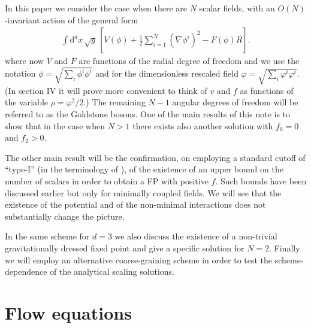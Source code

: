\documentclass[11pt]{book} %
\begin{document}
In this paper we consider the case when
there are $N$ scalar fields, with an $O(N)$-invariant
action of the general form
\begin{align}
  \label{action}
  \int \mathrm d^dx \, \sqrt{g} \,
  \left[ V(\phi) + \frac{1}{2}\sum_{i=1}^N \left( \nabla\phi^i \right)^2 - F(\phi)R \right] .
\end{align}
where now $V$ and $F$ are functions of the radial degree of freedom
and we use the notation $\phi=\sqrt{\sum_i \phi^i\phi^i}$ and for the dimensionless rescaled field
$\varphi=\sqrt{\sum_i \varphi^i \varphi^i}$.
(In section IV it will prove more convenient to think of
$v$ and $f$ as functions of the variable $\rho=\varphi^2/2$.)
The remaining $N-1$ angular degrees
of freedom will be referred to as the Goldstone bosons.
One of the main results of this note is to show that in the case
when $N>1$ there exists also another solution with $f_0=0$ and $f_2>0$.

The other main result will be the confirmation,
on employing a standard cutoff of ``type-I''
(in the terminology of \cite{Codello:2008vh}),
of the existence  of an upper bound on the number of scalars in order to obtain a FP with positive $f$.
Such bounds have been discussed earlier but only for minimally
coupled fields.
We will see that the existence of the potential and of the non-minimal interactions does
not substantially change the picture.

In the same scheme for $d=3$ we also discuss the existence
of a non-trivial gravitationally dressed fixed point
and give a specific solution for $N=2$.
Finally we will employ an alternative coarse-graining scheme
in order to test the scheme-dependence of the analytical scaling solutions.


\section{Flow equations}
\end{document}
